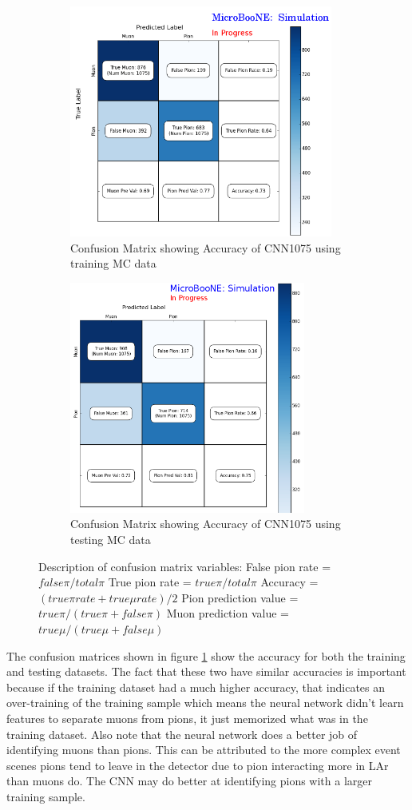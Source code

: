 \begin{figure}[htp!]
\centering
	\begin{subfigure}[b]{.68\textwidth}
	\includegraphics[width=\textwidth,height=3in]{figs/confusion1_train.png}
	\caption{Confusion Matrix showing Accuracy of CNN1075 using training MC data}
	\end{subfigure}
	\quad
	\begin{subfigure}[b]{.6\textwidth}
	\includegraphics[width=\textwidth,height=3in]{figs/confusion1_test.png}
	\caption{Confusion Matrix showing Accuracy of CNN1075 using testing MC data}
	\end{subfigure}
	\quad
\caption{Description of confusion matrix variables: False pion rate = $false \pi/ total \pi$ True pion rate = $true \pi/total \pi$ Accuracy = $(true \pi rate + true \mu rate)/2$ Pion prediction value = $true \pi/(true \pi + false \pi)$ Muon prediction value = $true \mu/(true \mu + false \mu)$}
\label{fig:confusion1075}
\end{figure}

The confusion matrices shown in figure \ref{fig:confusion1075} show the accuracy for both the training and testing datasets. The fact that these two have similar accuracies is important because if the training dataset had a much higher accuracy, that indicates an over-training of the training sample which means the neural network didn't learn features to separate muons from pions, it just memorized what was in the training dataset. Also note that the neural network does a better job of identifying muons than pions. This can be attributed to the more complex event scenes pions tend to leave in the detector due to pion interacting more in LAr than muons do. The CNN may do better at identifying pions with a larger training sample.

